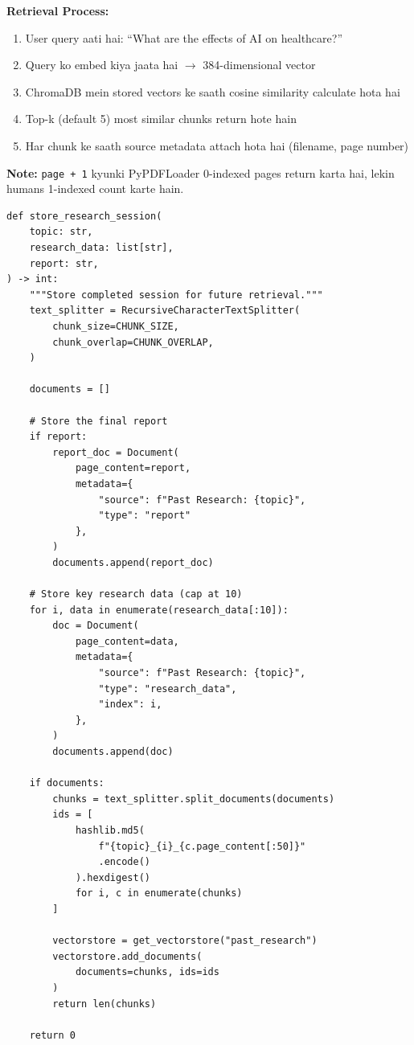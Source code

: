 \documentclass[12pt, a4paper]{article}
\begin{document}
\begin{codestorybox}
\textbf{Retrieval Process:}
\begin{enumerate}
\item User query aati hai: ``What are the effects of AI on healthcare?''
\item Query ko embed kiya jaata hai $\rightarrow$ 384-dimensional vector
\item ChromaDB mein stored vectors ke saath cosine similarity calculate hota hai
\item Top-k (default 5) most similar chunks return hote hain
\item Har chunk ke saath source metadata attach hota hai (filename, page number)
\end{enumerate}

\textbf{Note:} \texttt{page + 1} kyunki PyPDFLoader 0-indexed pages return karta hai, lekin humans 1-indexed count karte hain.
\end{codestorybox}

\begin{lstlisting}[style=pythonstyle, title={\color{accentgreen}\faIcon{file} Research Session Memory}]
def store_research_session(
    topic: str,
    research_data: list[str],
    report: str,
) -> int:
    """Store completed session for future retrieval."""
    text_splitter = RecursiveCharacterTextSplitter(
        chunk_size=CHUNK_SIZE,
        chunk_overlap=CHUNK_OVERLAP,
    )

    documents = []

    # Store the final report
    if report:
        report_doc = Document(
            page_content=report,
            metadata={
                "source": f"Past Research: {topic}",
                "type": "report"
            },
        )
        documents.append(report_doc)

    # Store key research data (cap at 10)
    for i, data in enumerate(research_data[:10]):
        doc = Document(
            page_content=data,
            metadata={
                "source": f"Past Research: {topic}",
                "type": "research_data",
                "index": i,
            },
        )
        documents.append(doc)

    if documents:
        chunks = text_splitter.split_documents(documents)
        ids = [
            hashlib.md5(
                f"{topic}_{i}_{c.page_content[:50]}"
                .encode()
            ).hexdigest()
            for i, c in enumerate(chunks)
        ]

        vectorstore = get_vectorstore("past_research")
        vectorstore.add_documents(
            documents=chunks, ids=ids
        )
        return len(chunks)

    return 0
\end{lstlisting}
\end{document}
